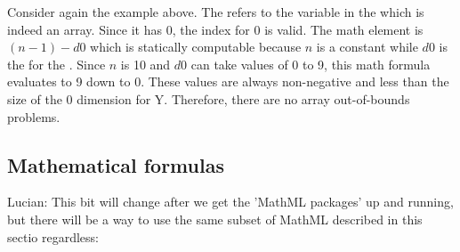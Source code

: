 Consider again the example above.   The \Index refers to the variable in the \AssignmentRule which is indeed an array.   Since it has  0, the index for  0 is valid.   The math element is $(n-1)  - d0$ which is statically computable because $n$ is a constant \Parameter while $d0$ is the \Dimension {} for the \AssignmentRule.   Since $n$ is 10 and $d0$ can take values of 0 to 9, this math formula evaluates to 9 down to 0.   These values are always non-negative and less than the size of the 0 dimension for Y.   Therefore, there are no array out-of-bounds problems.

\subsection{Mathematical formulas}
\label{math-formulas}

{\color{red} Lucian: \notice This bit will change after we get the 'MathML packages' up and running, but there will be a way to use the same subset of MathML described in this sectio regardless:}


